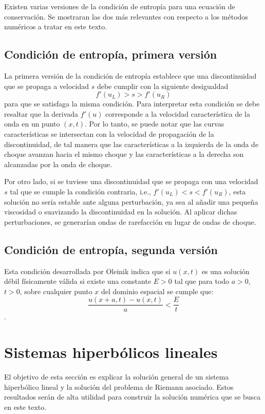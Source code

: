 Existen varias versiones de la condición de entropía para una ecuación de conservación. Se mostraran las dos más relevantes con respecto a los métodos numéricos a tratar en este texto.
\subsection{Condición de entropía, primera versión}
La primera versión de la condición de entropía establece que una discontinuidad que se propaga a velocidad $s$ debe cumplir con la siguiente desigualdad
\begin{equation}
	f'(u_L) > s > f'(u_R)
	\label{eq:entropy}
\end{equation}
para que se satisfaga la misma condición. Para interpretar esta condición se debe resaltar que la derivada $f'(u)$ corresponde a la velocidad característica de la onda en un punto $(x,t)$. Por lo tanto, se puede notar que las curvas características se intersectan con la velocidad de propagación de la discontinuidad, de tal manera que las características a la izquierda de la onda de choque avanzan hacia el mismo choque y las características a la derecha son alcanzadas por la onda de choque.

Por otro lado, si se tuviese una discontinuidad que se propaga con una velocidad $s$ tal que se cumple la condición contraria, i.e., $f'(u_L) < s < f'(u_R)$, esta solución no sería estable ante alguna perturbación, ya sea al añadir una pequeña viscosidad o suavizando la discontinuidad en la solución. Al aplicar dichas perturbaciones, se generarían ondas de rarefacción en lugar de ondas de choque.

\subsection{Condición de entropía, segunda versión}
Esta condición desarrollada por Oleinik indica que si $u(x,t)$ es una solución débil físicamente válida si existe una constante $E >0$  tal que para todo $a>0$, $t>0$, sobre cualquier punto $x$ del dominio espacial se cumple que:
\begin{equation}
	\frac{u(x+a,t) - u(x,t)}{a} < \frac{E}{t}
\end{equation}.

\section{Sistemas hiperbólicos lineales}
El objetivo de esta sección es explicar la solución general de un sistema hiperbólico lineal y la solución del problema de Riemann asociado. Estos resultados serán de alta utilidad para construir la solución numérica que se busca en este texto.

